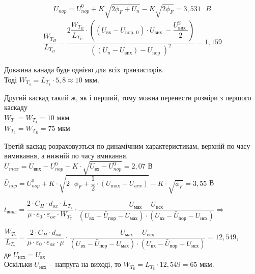 \documentclass[a4paper,14pt]{extreport}
\begin{document}
  $$ U_{nop} =  U_{nop}^0+K\sqrt{2\phi_F+U_n}-K\sqrt{2\phi_F}  = 3,531 \text{ }B$$ 
  \begin{align*}
  \dfrac{W_{T_{H}}}{L_{T_{H}}}=
  \dfrac{2 \dfrac{W_{T_{E}}}{L_{T_E}} \cdot\left(\left(U_{\text{вх}}-U_{\text {nop. 0}}\right) \cdot U_{\text {вих }}-
  \dfrac{U_{\text {вих }}^{2}}{2}\right)}{\left(\left(U_{n}-U_{\text{вих}}\right)-U_{\text {nop }}\right)^{2}}=1,159
  \end{align*}







  Довжина канада буде однією для всіх  транзисторів. \\
  Тоді $W_{T_{4}} =  L_{T_{4}} \cdot 5,8 \approx 10 \text{ мкм}$.

  Другий каскад такий ж, як і перший, тому можна перенести розміри з першого каскаду  \\
  $W_{T_{5}}=W_{T_{4}}=10  \text{ мкм}$\\
  $W_{T_{6}}=W_{T_{E}}=75  \text{ мкм}$

  Третій каскад розраховуэться по динамічним характеристикам, верхній по часу  вимикання, а нижній по часу вмикання.\\
  $U_{m a x}=U_{\text{вих}}-U_{n o p}^{0}-K \cdot \sqrt{U_{\text{вх}}-U_{n o p}^{0}}=2,07 $ В\\
  $\bar{U}_{n o p}=U_{n o p}^{0}+K \cdot \sqrt{2 \cdot \phi_{F}+\dfrac{1}{2} \cdot\left(U_{\max }-U_{u c x}\right)}-K \cdot \sqrt{\phi_{F}}=3,55$ В


  $t_{\text{викл}} = \dfrac{2\cdot C_H \cdot d_{ox} \cdot L_{T_{7}}}{\mu \cdot \varepsilon_0 \cdot \varepsilon_{ox} \cdot W_{T_{7}}} \cdot
  \dfrac{U_{\text{мах}} - U_{\text{исх}}}{(U_{\text{вх}} - \bar{U}_{\text{пор}} - U_{\text{мах}})\cdot(U_{\text{вх}} - \bar{U}_{\text{пор}} - U_{\text{исх}})} \Rightarrow$

  $ \dfrac{W_{T_{7}}}{L_{T_{7}}} =
  \dfrac{2\cdot C_H \cdot d_{ox} }{\mu \cdot \varepsilon_0 \cdot \varepsilon_{ox} \cdot\mu} \cdot
  \dfrac{U_{\text{мах}} - U_{\text{исх}}}{(U_{\text{вх}} - \bar{U}_{\text{пор}} - U_{\text{мах}})\cdot(U_{\text{вх}} - \bar{U}_{\text{пор}} - U_{\text{исх}})} = 12,549$,  \\

  де  $U_{\text{исх}} = U_{\text{вх}}$\\


  Оскільки $U_{\text{исх}}$ -- напруга на виході, то $W_{T_{6}} = L_{T_{6}} \cdot 12,549 =  65$ мкм.\\
\end{document}
